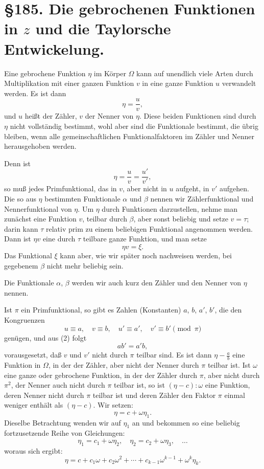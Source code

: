 \documentclass[12pt,a4paper]{article}
\theoremstyle{definition}
\begin{document}
\newpage
\section*{\S 185. Die gebrochenen Funktionen in $z$ und die Taylorsche Entwickelung.}

Eine gebrochene Funktion $\eta$ im Körper $\Omega$ kann auf unendlich viele Arten durch Multiplikation mit einer ganzen Funktion $v$ in eine ganze Funktion $u$ verwandelt werden. Es ist dann
\begin{equation}
\eta = \frac{u}{v},
\end{equation}
und $u$ heißt der Zähler, $v$ der Nenner von $\eta$. Diese beiden Funktionen sind durch $\eta$ nicht vollständig bestimmt, wohl aber sind die Funktionale bestimmt, die übrig bleiben, wenn alle gemeinschaftlichen Funktionalfaktoren im Zähler und Nenner herausgehoben werden.

Denn ist
\begin{equation}
\eta = \frac{u}{v} = \frac{u'}{v'},
\end{equation}
so muß jedes Primfunktional, das in $v$, aber nicht in $u$ aufgeht, in $v'$ aufgehen. Die so aus $\eta$ bestimmten Funktionale $\alpha$ und $\beta$ nennen wir Zählerfunktional und Nennerfunktional von $\eta$. Um $\eta$ durch Funktionen darzustellen, nehme man zunächst eine Funktion $v$, teilbar durch $\beta$, aber sonst beliebig und setze $v = \tau$; darin kann $\tau$ relativ prim zu einem beliebigen Funktional angenommen werden. Dann ist $\eta v$ eine durch $\tau$ teilbare ganze Funktion, und man setze
\[\eta v = \xi.\]
Das Funktional $\xi$ kann aber, wie wir später noch nachweisen werden, bei gegebenem $\beta$ nicht mehr beliebig sein.

Die Funktionale $\alpha$, $\beta$ werden wir auch kurz den Zähler und den Nenner von $\eta$ nennen.

Ist $\pi$ ein Primfunktional, so gibt es Zahlen (Konstanten) $a$, $b$, $a'$, $b'$, die den Kongruenzen
\[u \equiv a, \quad v \equiv b, \quad u' \equiv a', \quad v' \equiv b' \pmod{\pi}\]
genügen, und aus (2) folgt
\[ab' = a'b,\]
vorausgesetzt, daß $v$ und $v'$ nicht durch $\pi$ teilbar sind. Es ist dann $\eta - \frac{a}{b}$ eine Funktion in $\Omega$, in der der Zähler, aber nicht der Nenner durch $\pi$ teilbar ist. Ist $\omega$ eine ganze oder gebrochene Funktion, in der der Zähler durch $\pi$, aber nicht durch $\pi^2$, der Nenner auch nicht durch $\pi$ teilbar ist, so ist $(\eta - c):\omega$ eine Funktion, deren Nenner nicht durch $\pi$ teilbar ist und deren Zähler den Faktor $\pi$ einmal weniger enthält als $(\eta - c)$. Wir setzen:
\[\eta = c + \omega\eta_1.\]
Dieselbe Betrachtung wenden wir auf $\eta_1$ an und bekommen so eine beliebig fortzusetzende Reihe von Gleichungen:
\[\eta_1 = c_1 + \omega\eta_2, \quad \eta_2 = c_2 + \omega\eta_3, \quad \ldots\]
woraus sich ergibt:
\begin{equation}
\eta = c + c_1\omega + c_2\omega^2 + \cdots + c_{k-1}\omega^{k-1} + \omega^k\eta_k.
\end{equation}
\end{document}
